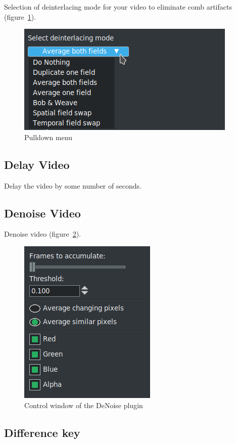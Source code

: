 Selection of deinterlacing mode for your video to eliminate comb artifacts (figure~\ref{fig:deinterlace}).

\begin{figure}[htpb]
    \centering
    \includegraphics[width=0.6\linewidth]{images/deinterlace.png}
    \caption{Pulldown menu}
    \label{fig:deinterlace}
\end{figure}

\subsection{Delay Video}%
\label{sub:delay_video}

Delay the video by some number of seconds.

\subsection{Denoise Video}%
\label{sub:denoise_video}

Denoise video (figure~\ref{fig:denoise}).

\begin{figure}[htpb]
    \centering
    \includegraphics[width=0.4\linewidth]{images/denoise.png}
    \caption{Control window of the DeNoise plugin}
    \label{fig:denoise}
\end{figure}

\subsection{Difference key}%
\label{sub:difference_key}

